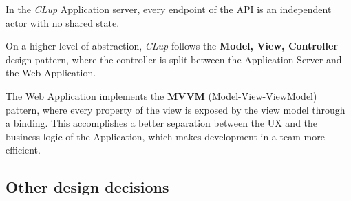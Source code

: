 In the \emph{CLup} Application server, every endpoint of the API is an independent actor with no shared state.

On a higher level of abstraction, \emph{CLup} follows the \textbf{Model, View, Controller} design pattern, where the controller is split between the Application Server and the Web Application.

The Web Application implements the \textbf{MVVM} (Model-View-ViewModel) pattern, where every property of the view is exposed by the view model through a binding. This accomplishes a better separation between the UX and the business logic of the Application, which makes development in a team more efficient.

\subsection{Other design decisions}
